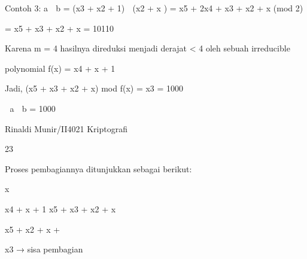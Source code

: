 \documentclass{article}
\begin{document}

Contoh 3:   a  b = (x3 + x2 + 1)  (x2 + x )  = x5 + 2x4 + x3 + x2 + x (mod 2)





                 = x5 + x3 + x2 + x = 10110

 Karena m = 4 hasilnya direduksi menjadi derajat < 4 oleh  sebuah irreducible 

polynomial  f(x) = x4 + x + 1 


    Jadi,   (x5 + x3 + x2 + x)  mod f(x)   =  x3  = 1000

  a  b = 1000 


Rinaldi Munir/II4021 Kriptografi

23

Proses pembagiannya ditunjukkan sebagai berikut:


                      x

           x4 + x + 1       x5 + x3 + x2 + x 



       x5 +        x2 + x   +    



               x3      →  sisa pembagian
\end{document}
